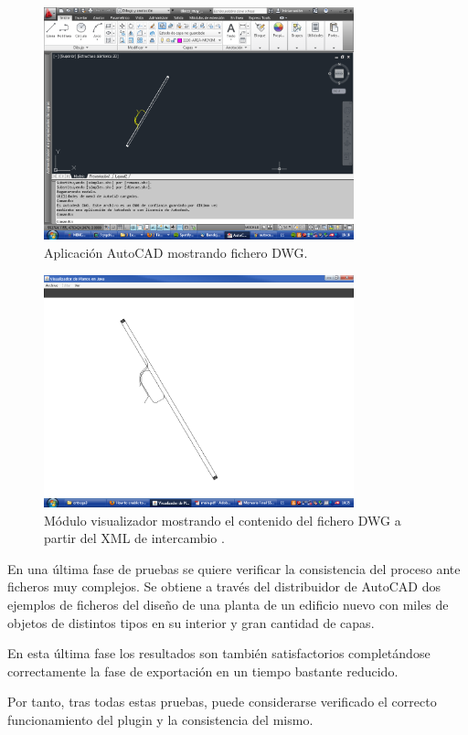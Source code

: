 \begin{figure}[H]
\begin{center}
\includegraphics[width=0.8\textwidth]{imgs/autocad2}
\caption{Aplicación AutoCAD mostrando fichero DWG.}
\end{center}
\end{figure}

\begin{figure}[H]
\begin{center}
\includegraphics[width=0.8\textwidth]{imgs/ejemplo_salida}
\caption{Módulo visualizador mostrando el contenido del fichero DWG a partir del XML de intercambio \cite{Luis-Fernandez-SSII}.}
\end{center}
\end{figure}

En una última fase de pruebas se quiere verificar la consistencia del proceso ante ficheros muy complejos. Se obtiene a través del distribuidor de AutoCAD dos ejemplos de ficheros del diseño de una planta de un edificio nuevo con miles de objetos de distintos tipos en su interior y gran cantidad de capas. 

En esta última fase los resultados son también satisfactorios completándose correctamente la fase de exportación en un tiempo bastante reducido.

Por tanto, tras todas estas pruebas, puede considerarse verificado el correcto funcionamiento del plugin y la consistencia del mismo.